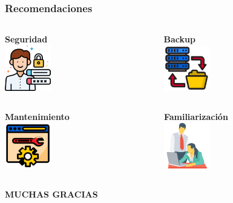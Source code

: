 \documentclass[xcolor=dvipsnames, xcolor=table]{beamer}
\begin{document}
\begin{frame}
    \frametitle{Recomendaciones}
    \begin{columns}
      \begin{column}{0.5\textwidth}
        \centering\textbf{\textcolor{color3}{\small Seguridad}}\\
        \vspace{3mm}
        \centering\includegraphics[width=2cm]{001-privacy}
      \end{column}
      \begin{column}{0.5\textwidth}
        \centering\textbf{\textcolor{color3}{\small Backup}}\\
        \vspace{3mm}
        \centering\includegraphics[width=2cm]{002-backup}
      \end{column}
      
    \end{columns}
    \vspace{5mm}
    \begin{columns}
      \begin{column}{0.5\textwidth}
        \centering\textbf{\textcolor{color3}{\small Mantenimiento}}\\
        \vspace{3mm}
        \centering\includegraphics[width=2cm]{003-optimize}
      \end{column}
      \begin{column}{0.5\textwidth}
        \centering\textbf{\textcolor{color3}{\small Familiarización}}\\
        \vspace{3mm}
        \centering\includegraphics[width=2cm]{working}
      \end{column}
      
    \end{columns}
\end{frame}

\begin{frame}
    \centering\textbf{\huge{\textcolor{color1}{MUCHAS GRACIAS}}}    
\end{frame}
\end{document}
